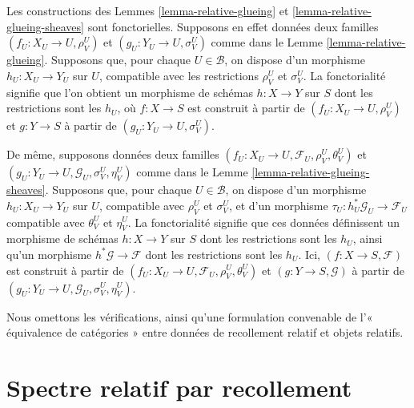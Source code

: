 \begin{remark}
\label{remark-relative-glueing-functorial}
Les constructions des Lemmes \ref{lemma-relative-glueing} et
\ref{lemma-relative-glueing-sheaves} sont fonctorielles.
Supposons en effet données deux familles
$(f_U : X_U \to U, \rho^U_V)$ et
$(g_U : Y_U \to U, \sigma^U_V)$ comme dans le
Lemme \ref{lemma-relative-glueing}. Supposons que, pour chaque
$U \in \mathcal{B}$, on dispose d'un morphisme $h_U : X_U \to Y_U$ sur
$U$, compatible avec les restrictions $\rho^U_V$ et $\sigma^U_V$.
La fonctorialité signifie que l'on obtient un morphisme de schémas
$h : X \to Y$ sur $S$ dont les restrictions sont les $h_U$, où
$f : X \to S$ est construit à partir de
$(f_U : X_U \to U, \rho^U_V)$ et $g : Y \to S$ à partir de
$(g_U : Y_U \to U, \sigma^U_V)$.

\medskip\noindent
De même, supposons données deux familles
$(f_U : X_U \to U, \mathcal{F}_U, \rho^U_V, \theta^U_V)$ et
$(g_U : Y_U \to U, \mathcal{G}_U, \sigma^U_V, \eta^U_V)$ comme dans le
Lemme \ref{lemma-relative-glueing-sheaves}.
Supposons que, pour chaque
$U \in \mathcal{B}$, on dispose d'un morphisme
$h_U : X_U \to Y_U$ sur $U$, compatible
avec $\rho^U_V$ et $\sigma^U_V$,
et d'un morphisme $\tau_U : h_U^*\mathcal{G}_U \to \mathcal{F}_U$
compatible avec $\theta^U_V$ et $\eta^U_V$.
La fonctorialité signifie que ces données définissent un morphisme de
schémas $h : X \to Y$ sur $S$ dont les
restrictions sont les $h_U$, ainsi
qu'un morphisme $h^*\mathcal{G} \to \mathcal{F}$ dont les restrictions
sont les $h_U$. Ici, $(f : X \to S, \mathcal{F})$ est construit à
partir de $(f_U : X_U \to U, \mathcal{F}_U, \rho^U_V, \theta^U_V)$ et
$(g : Y \to S, \mathcal{G})$ à partir de
$(g_U : Y_U \to U, \mathcal{G}_U, \sigma^U_V, \eta^U_V)$.

\medskip\noindent
Nous omettons les vérifications, ainsi qu'une formulation convenable de
l'« équivalence de catégories » entre données de recollement relatif et
objets relatifs.
\end{remark}















\section{Spectre relatif par recollement}
\label{section-spec-via-glueing}

